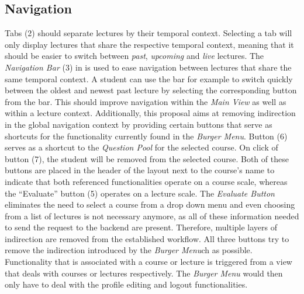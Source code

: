 \subsection{Navigation}
\label{section:con:proposals:mainview:navigation}
Tabs (2) should separate lectures by their temporal context. Selecting a tab will only display lectures that share the respective temporal context, meaning that it should be easier to switch between \emph{past}, \emph{upcoming} and \emph{live} lectures.
The \emph{Navigation Bar} (3) in  is used to ease navigation between lectures that share the same temporal context. A student can use the bar for example to switch quickly between the oldest and newest past lecture by selecting the corresponding button from the bar. This should improve navigation within the \emph{Main View} as well as within a lecture context. 
Additionally, this proposal aims at removing indirection in the global navigation context by providing certain buttons that serve as shortcuts for the functionality currently found in the \emph{Burger Menu}. Button (6) serves as a shortcut to the \emph{Question Pool} for the selected course. On click of button (7), the student will be removed from the selected course. Both of these buttons are placed in the header of the layout next to the course’s name to indicate that both referenced functionalities operate on a course scale, whereas the “Evaluate” button (5) operates on a lecture scale. The \emph{Evaluate Button} eliminates the need to select a course from a drop down menu and even choosing from a list of lectures is not necessary anymore, as all of these information needed to send the request to the backend are present. Therefore, multiple layers of indirection are removed from the established workflow. All three buttons try to remove the indirection introduced by the \emph{Burger Menu}ch as possible. Functionality that is associated with a course or lecture is triggered from a view that deals with courses or lectures respectively. The \emph{Burger Menu} would then only have to deal with the profile editing and logout functionalities.

